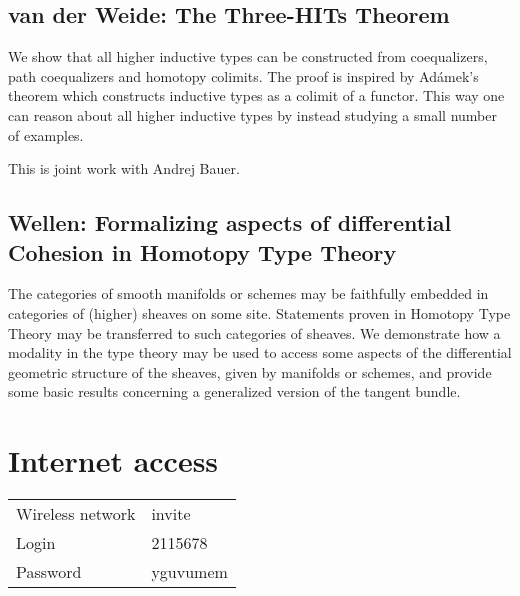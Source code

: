 \documentclass[a4paper,10pt]{scrartcl}
\begin{document}
\subsection*{van der Weide: The Three-HITs Theorem}

We show that all higher inductive types can be constructed from coequalizers, path coequalizers and homotopy colimits. The proof is inspired by Adámek's theorem which constructs inductive types as a colimit of a functor. This way one can reason about all higher inductive types by instead studying a small number of examples.

This is joint work with Andrej Bauer.

\subsection*{Wellen: Formalizing aspects of differential Cohesion in Homotopy Type Theory}

The categories of smooth manifolds or schemes may be faithfully embedded in categories of (higher) sheaves on some site. Statements proven in Homotopy Type Theory may be transferred to such categories of sheaves.
We demonstrate how a modality in the type theory may be used to access some aspects of the differential geometric structure of the sheaves, given by manifolds or schemes, and provide some basic results concerning a generalized version of the tangent bundle.



\newpage
\section*{Internet access}
  
\begin{tabular}{ll}
Wireless network & invite \\
Login & 2115678 \\
Password & yguvumem
\end{tabular}
\end{document}
